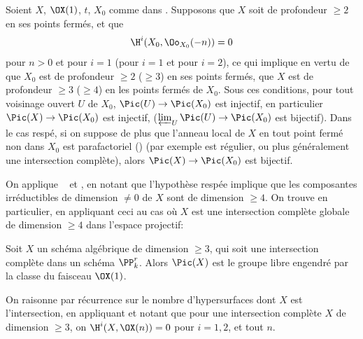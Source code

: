 \begin{corollaire} \label{XII.3.6} Soient $X$, $\OX(1)$, $t$, $X_0$ comme dans . Supposons que $X$ soit de profondeur $\geq 2$ en ses points ferm\'es, et que
\[
\H^i(X_0, \Oo_{X_0}(-n))=0
\]
pour $n>0$ et pour $i=1$ (\resp pour $i=1$ et pour $i=2$), ce qui implique en vertu de  que $X_0$ est de profondeur $\geq 2$ (\resp $\geq 3$) en ses points ferm\'es, \ie que $X$ est de profondeur $\geq 3$ (\resp $\geq 4$) en les points ferm\'es de $X_0$. Sous ces conditions, pour tout voisinage ouvert $U$ de $X_0$, $\Pic(U)\to\Pic(X_0)$ est injectif, en particulier $\Pic(X)\to\Pic(X_0)$ est injectif, (\resp $\varprojlim_U \Pic(U)\to\Pic(X_0)$ est bijectif). Dans le cas resp\'e, si on suppose de plus que l'anneau local de $X$ en tout point ferm\'e non dans $X_0$ est parafactoriel () (par exemple est r\'egulier, ou plus g\'en\'eralement une intersection compl\`ete), alors $\Pic(X)\to\Pic(X_0)$ est bijectif.
\end{corollaire}
On applique ~ et , en notant que l'hypoth\`ese resp\'ee implique que les composantes irr\'eductibles de dimension $\neq 0$ de $X$ sont de dimension $\geq 4$. On trouve en particulier, en appliquant ceci au cas o\`u $X$ est une intersection compl\`ete globale de dimension $\geq 4$ dans l'espace projectif:

\begin{corollaire} \label{XII.3.7} Soit $X$ un sch\'ema alg\'ebrique de dimension $\geq 3$, qui soit une intersection compl\`ete dans un sch\'ema $\PP_k^r$. Alors $\Pic(X)$ est le groupe libre engendr\'e par la classe du faisceau $\OX(1)$.
\end{corollaire}
On raisonne par r\'ecurrence sur le nombre d'hypersurfaces dont $X$ est l'intersection, en appliquant  et notant que pour une intersection compl\`ete $X$ de dimension $\geq 3$, on $\H^i(X, \OX(n))=0$ pour $i=1, 2$, et tout $n$.


